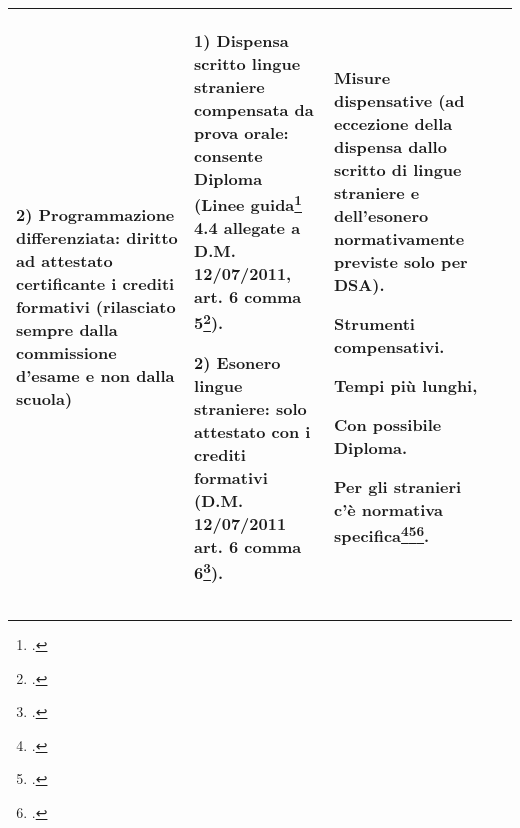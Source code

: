 \begin{longtable}{p{}p{}p{}p{}}
 \textbf{2) Programmazione differenziata:} diritto ad attestato certificante i crediti formativi (rilasciato sempre dalla commissione d'esame e non dalla scuola) 
 &
 \textbf{1) Dispensa scritto lingue straniere compensata da prova orale:} consente Diploma (Linee guida\footcite{LineGuida2011} 4.4 allegate a D.M. 12/07/2011, art. 6 comma 5\footcite{DM_122_2011}).
 
 \textbf{2) Esonero lingue straniere:} solo attestato con i crediti formativi (D.M. 12/07/2011 art. 6 comma 6\footcite{DM_122_2011}).
 &Misure dispensative (ad eccezione della dispensa dallo scritto di lingue straniere e dell'esonero normativamente previste solo per DSA).
 
 Strumenti compensativi.
 
 Tempi più lunghi,
 
 Con possibile Diploma.
 
 Per gli stranieri c'è normativa specifica\footcite{CM_2_2010}\footcite{MIUR2007}\footcite{CM_24_2006}.\\
 \bottomrule
\end{longtable}